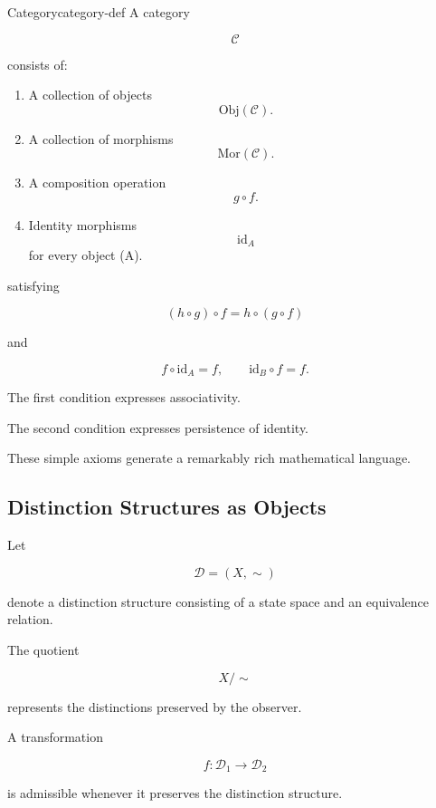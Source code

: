 \documentclass[12pt,twoside,openright]{book}
\begin{document}
\begin{definition}{Category}{category-def}
A category

\[
\mathcal C
\]

consists of:

\begin{enumerate}
\item A collection of objects
\[
\mathrm{Obj}(\mathcal C).
\]

\item A collection of morphisms
\[
\mathrm{Mor}(\mathcal C).
\]

\item A composition operation
\[
g\circ f.
\]

\item Identity morphisms
\[
\mathrm{id}_A
\]
for every object (A).
\end{enumerate}

satisfying

\[
(h\circ g)\circ f
=

h\circ(g\circ f)
\]

and

\[
f\circ\mathrm{id}_A
=

f,
\qquad
\mathrm{id}_B\circ f
=

f.
\]
\end{definition}

The first condition expresses associativity.

The second condition expresses persistence of identity.

These simple axioms generate a remarkably rich
mathematical language.

\subsection{Distinction Structures as Objects}

Let

\[
\mathcal{D}=(X,\sim)
\]

denote a distinction structure consisting of a state space
and an equivalence relation.

The quotient

\[
X/{\sim}
\]

represents the distinctions preserved by the observer.

A transformation

\[
f:\mathcal{D}_1\rightarrow\mathcal{D}_2
\]

is admissible whenever it preserves the distinction
structure.
\end{document}
